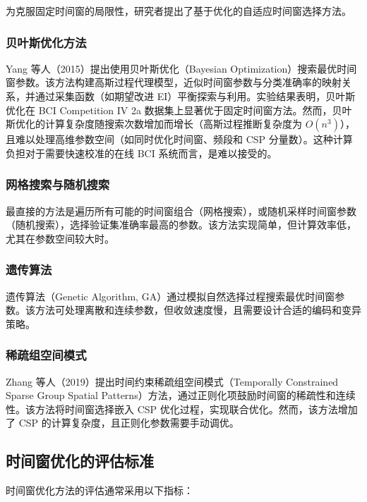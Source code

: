 为克服固定时间窗的局限性，研究者提出了基于优化的自适应时间窗选择方法。

\subsubsection{贝叶斯优化方法}

Yang 等人（2015）提出使用贝叶斯优化（Bayesian Optimization）搜索最优时间窗参数\cite{yang2015time}。该方法构建高斯过程代理模型，近似时间窗参数与分类准确率的映射关系，并通过采集函数（如期望改进 EI）平衡探索与利用。实验结果表明，贝叶斯优化在 BCI Competition IV 2a 数据集上显著优于固定时间窗方法\cite{yang2015time}。然而，贝叶斯优化的计算复杂度随搜索次数增加而增长（高斯过程推断复杂度为 $O(n^3)$），且难以处理高维参数空间（如同时优化时间窗、频段和 CSP 分量数）。这种计算负担对于需要快速校准的在线 BCI 系统而言，是难以接受的。

\subsubsection{网格搜索与随机搜索}

最直接的方法是遍历所有可能的时间窗组合（网格搜索），或随机采样时间窗参数（随机搜索），选择验证集准确率最高的参数。该方法实现简单，但计算效率低，尤其在参数空间较大时。

\subsubsection{遗传算法}

遗传算法（Genetic Algorithm, GA）通过模拟自然选择过程搜索最优时间窗参数。该方法可处理离散和连续参数，但收敛速度慢，且需要设计合适的编码和变异策略。

\subsubsection{稀疏组空间模式}

Zhang 等人（2019）提出时间约束稀疏组空间模式（Temporally Constrained Sparse Group Spatial Patterns）方法，通过正则化项鼓励时间窗的稀疏性和连续性\cite{zhang2019temporally}。该方法将时间窗选择嵌入 CSP 优化过程，实现联合优化。然而，该方法增加了 CSP 的计算复杂度，且正则化参数需要手动调优。

\subsection{时间窗优化的评估标准}
\label{subsec:evaluation_metrics}

时间窗优化方法的评估通常采用以下指标\cite{tangermann2012review}：

